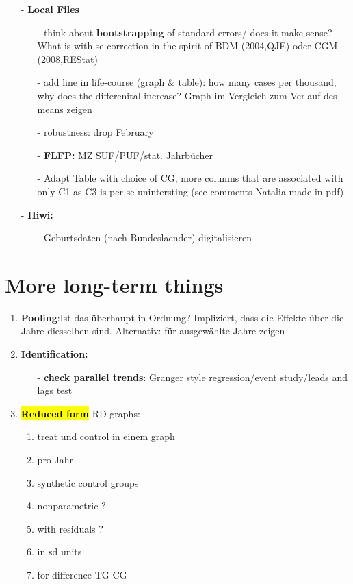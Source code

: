 \documentclass[11pt,a4paper]{article}
\begin{document}
{\begin{itemize}
\item[-] \textbf{Local Files}
\begin{itemize}
	\item[-] think about \textbf{bootstrapping} of standard errors/ does it make sense? What is with se correction in the spirit of BDM (2004,QJE) oder CGM (2008,REStat)
	\item[-] add line in life-course (graph \& table): how many cases per thousand, why does the differenital increase? Graph im Vergleich zum Verlauf des means zeigen
	
	\item[-] robustness: drop February
	
	\item[-] \textbf{FLFP:} MZ SUF/PUF/stat. Jahrbücher
	
	\item[-] Adapt Table with choice of CG, more columns that are associated with only C1 as C3 is per se unintersting (see comments Natalia made in pdf)
\end{itemize}	

\item[-] \textbf{Hiwi: }
\begin{itemize}
\item[-] Geburtsdaten (nach Bundeslaender) digitalisieren
\end{itemize}
\end{itemize}
\newpage
\section{More long-term things}
\begin{enumerate}
\item \textbf{Pooling}:\newline Ist das  überhaupt in Ordnung? Impliziert, dass die Effekte über die Jahre diesselben sind. Alternativ: für ausgewählte	Jahre zeigen


\item \textbf{Identification:}\vspace{-1em}
\begin{itemize}
	\item[-]\textbf{check parallel trends}: Granger style regression/event study/leads and lags test
\end{itemize}


\item \textbf{\hl{Reduced form}}\newline 
RD graphs:\vspace{-1em}
\begin{enumerate}
	\item treat und control in einem graph
	\item pro Jahr
	\item synthetic control groups
	\item nonparametric ? 
	\item with residuals ? 
	\item in sd units 
	\item for difference TG-CG
\end{enumerate}



\end{enumerate}}
\end{document}
